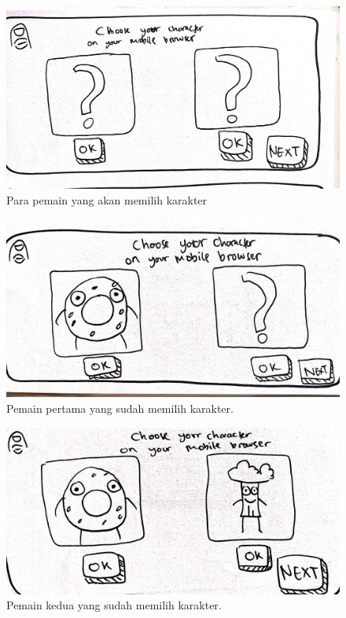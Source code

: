 \documentclass[a4paper,twoside]{article}
\begin{document}
\begin{enumerate}
		\begin{figure}[H]
			\centering
			\includegraphics[scale=0.1]{Gambar/web5_char1}
			\caption{Para pemain yang akan memilih karakter}
			\label{fig:5_web5_char1}
		\end{figure}
	
		\begin{figure}[H]
			\centering
			\includegraphics[scale=0.1]{Gambar/web6_char2}
			\caption{Pemain pertama yang sudah memilih karakter.}
			\label{fig:6_web6_char2}
		\end{figure}
	
		\begin{figure}[H]
			\centering
			\includegraphics[scale=0.1]{Gambar/web7_char3}
			\caption{Pemain kedua yang sudah memilih karakter.}
			\label{fig:7_web7_char3}
		\end{figure}
	

\end{enumerate}
\end{document}
